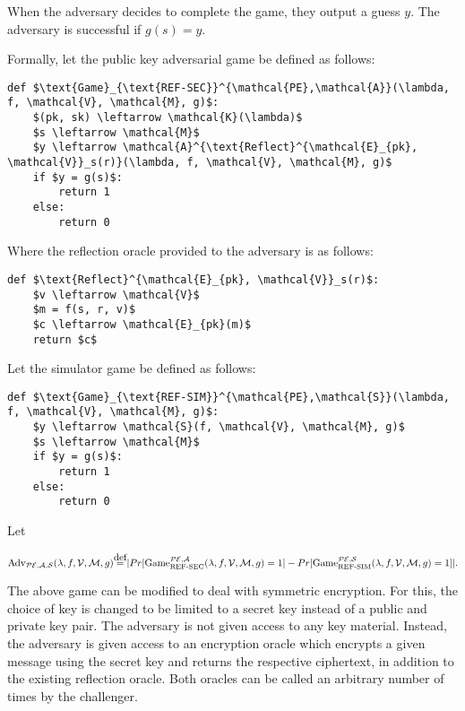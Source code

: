 \documentclass[a4paper, 11 pt, conference]{article}
\newcommand\defeq{\stackrel{\mathclap{\normalfont\mbox{def}}}{=}}
\begin{document}
When the adversary decides to complete the game, they output a guess $y$. The
adversary is successful if $g(s) = y$.

Formally, let the public key adversarial game be defined as follows:

\begin{lstlisting}[texcl,mathescape]
def $\text{Game}_{\text{REF-SEC}}^{\mathcal{PE},\mathcal{A}}(\lambda, f, \mathcal{V}, \mathcal{M}, g)$:
    $(pk, sk) \leftarrow \mathcal{K}(\lambda)$
    $s \leftarrow \mathcal{M}$
    $y \leftarrow \mathcal{A}^{\text{Reflect}^{\mathcal{E}_{pk}, \mathcal{V}}_s(r)}(\lambda, f, \mathcal{V}, \mathcal{M}, g)$
    if $y = g(s)$:
        return 1
    else:
        return 0
\end{lstlisting}

Where the reflection oracle provided to the adversary is as follows:

\begin{lstlisting}[texcl,mathescape]
def $\text{Reflect}^{\mathcal{E}_{pk}, \mathcal{V}}_s(r)$:
    $v \leftarrow \mathcal{V}$
    $m = f(s, r, v)$
    $c \leftarrow \mathcal{E}_{pk}(m)$
    return $c$
\end{lstlisting}

Let the simulator game be defined as follows:

\begin{lstlisting}[texcl,mathescape]
def $\text{Game}_{\text{REF-SIM}}^{\mathcal{PE},\mathcal{S}}(\lambda, f, \mathcal{V}, \mathcal{M}, g)$:
    $y \leftarrow \mathcal{S}(f, \mathcal{V}, \mathcal{M}, g)$
    $s \leftarrow \mathcal{M}$
    if $y = g(s)$:
        return 1
    else:
        return 0
\end{lstlisting}

Let

\begin{equation*}
    \text{Adv}_{\mathcal{PE}, \mathcal{A}, \mathcal{S}}(\lambda, f, \mathcal{V}, \mathcal{M}, g)
    \defeq
    |Pr[\text{Game}_{\text{REF-SEC}}^{\mathcal{PE},\mathcal{A}}(\lambda, f, \mathcal{V}, \mathcal{M}, g) = 1]
    -
    Pr[\text{Game}_{\text{REF-SIM}}^{\mathcal{PE},\mathcal{S}}(\lambda, f, \mathcal{V}, \mathcal{M}, g) = 1]|.
\end{equation*}

The above game can be modified to deal with symmetric encryption. For this, the
choice of key is changed to be limited to a secret key instead of a public and
private key pair. The adversary is not given access to any key material.
Instead, the adversary is given access to an encryption oracle which encrypts a
given message using the secret key and returns the respective ciphertext, in
addition to the existing reflection oracle. Both oracles can be called an
arbitrary number of times by the challenger.
\end{document}
